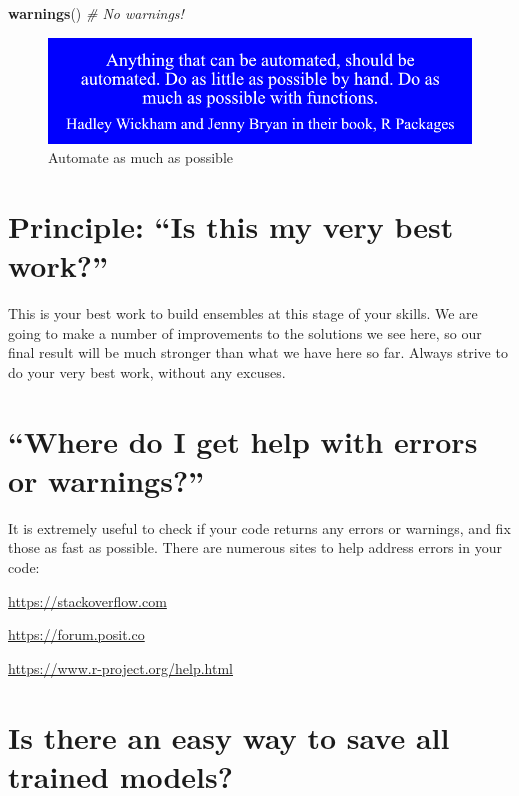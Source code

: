 \documentclass[
]{book}
\newenvironment{Shaded}{\begin{snugshade}}{\end{snugshade}}
\newcommand{\CommentTok}[1]{\textcolor[rgb]{0.56,0.35,0.01}{\textit{#1}}}
\newcommand{\FunctionTok}[1]{\textcolor[rgb]{0.13,0.29,0.53}{\textbf{#1}}}
\newcommand{\NormalTok}[1]{#1}
\begin{document}
\begin{Shaded}
\begin{Highlighting}[]
\FunctionTok{warnings}\NormalTok{() }\CommentTok{\# No warnings!}
\end{Highlighting}
\end{Shaded}

\begin{figure}
\centering
\includegraphics{_book/images/automate_as_much_as_possible.jpg}
\caption{Automate as much as
possible}
\end{figure}

\section{Principle: ``Is this my very best work?''}\label{principle-is-this-my-very-best-work}

This is your best work to build ensembles at this stage of your skills.
We are going to make a number of improvements to the solutions we see
here, so our final result will be much stronger than what we have here
so far. Always strive to do your very best work, without any excuses.

\section{``Where do I get help with errors or warnings?''}\label{where-do-i-get-help-with-errors-or-warnings}

It is extremely useful to check if your code returns any errors or
warnings, and fix those as fast as possible. There are numerous sites to
help address errors in your code:

\url{https://stackoverflow.com}

\url{https://forum.posit.co}

\url{https://www.r-project.org/help.html}

\section{Is there an easy way to save all trained models?}\label{is-there-an-easy-way-to-save-all-trained-models}
\end{document}
